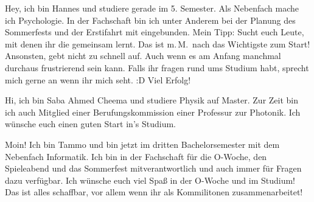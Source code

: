 \begin{multicols}{2}
{
Hey, ich bin Hannes und studiere gerade im 5. Semester. Als Nebenfach mache ich Psychologie. In der Fachschaft bin ich unter Anderem bei der Planung des Sommerfests und der Erstifahrt mit eingebunden. Mein Tipp: Sucht euch Leute, mit denen ihr die gemeinsam lernt. Das ist m.\,M.\ nach das Wichtigste zum Start! Ansonsten, gebt nicht zu schnell auf. Auch wenn es am Anfang manchmal durchaus frustrierend sein kann.
Falls ihr fragen rund ums Studium habt, sprecht mich gerne an wenn ihr mich seht. :D 
Viel Erfolg!
}

{
Hi, ich bin Saba Ahmed Cheema und studiere Physik auf Master. Zur Zeit bin ich auch Mitglied einer Berufungskommission einer Professur zur Photonik. Ich wünsche euch einen guten Start in's Studium. 
}

{
Moin! Ich bin Tammo und bin jetzt im dritten Bachelorsemester mit dem Nebenfach Informatik. Ich bin in der Fachschaft für die O-Woche, den Spieleabend und das Sommerfest mitverantwortlich und auch immer für Fragen dazu verfügbar. Ich wünsche euch viel Spaß in der O-Woche und im Studium! Das ist alles schaffbar, vor allem wenn ihr als Kommilitonen zusammenarbeitet!
}



\end{multicols}
